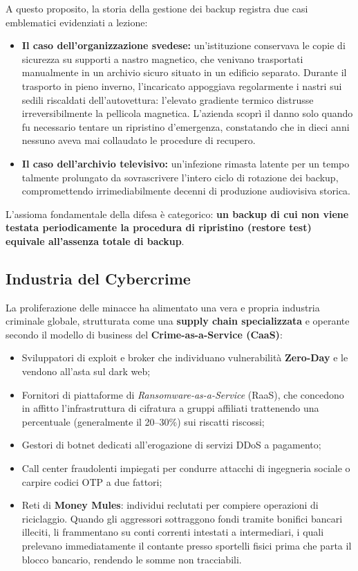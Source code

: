 \documentclass[../../main.tex]{subfiles}
\begin{document}
A questo proposito, la storia della gestione dei backup registra due casi emblematici evidenziati a lezione:
\begin{itemize}
    \item \textbf{Il caso dell'organizzazione svedese:} un'istituzione conservava le copie di sicurezza su supporti a nastro magnetico, che venivano trasportati manualmente in un archivio sicuro situato in un edificio separato. Durante il trasporto in pieno inverno, l'incaricato appoggiava regolarmente i nastri sui sedili riscaldati dell'autovettura: l'elevato gradiente termico distrusse irreversibilmente la pellicola magnetica. L'azienda scoprì il danno solo quando fu necessario tentare un ripristino d'emergenza, constatando che in dieci anni nessuno aveva mai collaudato le procedure di recupero.
    \item \textbf{Il caso dell'archivio televisivo:} un'infezione rimasta latente per un tempo talmente prolungato da sovrascrivere l'intero ciclo di rotazione dei backup, compromettendo irrimediabilmente decenni di produzione audiovisiva storica.
\end{itemize}
L'assioma fondamentale della difesa è categorico: \textbf{un backup di cui non viene testata periodicamente la procedura di ripristino (restore test) equivale all'assenza totale di backup}.

\subsection{Industria del Cybercrime}
\label{subsec:industria_cybercrime}

La proliferazione delle minacce ha alimentato una vera e propria industria criminale globale, strutturata come una \textbf{supply chain specializzata} e operante secondo il modello di business del \textbf{Crime-as-a-Service (CaaS)}:
\begin{itemize}
    \item Sviluppatori di exploit e broker che individuano vulnerabilità \textbf{Zero-Day} e le vendono all'asta sul dark web;
    \item Fornitori di piattaforme di \textit{Ransomware-as-a-Service} (RaaS), che concedono in affitto l'infrastruttura di cifratura a gruppi affiliati trattenendo una percentuale (generalmente il 20--30\%) sui riscatti riscossi;
    \item Gestori di botnet dedicati all'erogazione di servizi DDoS a pagamento;
    \item Call center fraudolenti impiegati per condurre attacchi di ingegneria sociale o carpire codici OTP a due fattori;
    \item Reti di \textbf{Money Mules}: individui reclutati per compiere operazioni di riciclaggio. Quando gli aggressori sottraggono fondi tramite bonifici bancari illeciti, li frammentano su conti correnti intestati a intermediari, i quali prelevano immediatamente il contante presso sportelli fisici prima che parta il blocco bancario, rendendo le somme non tracciabili.
\end{itemize}
\end{document}
